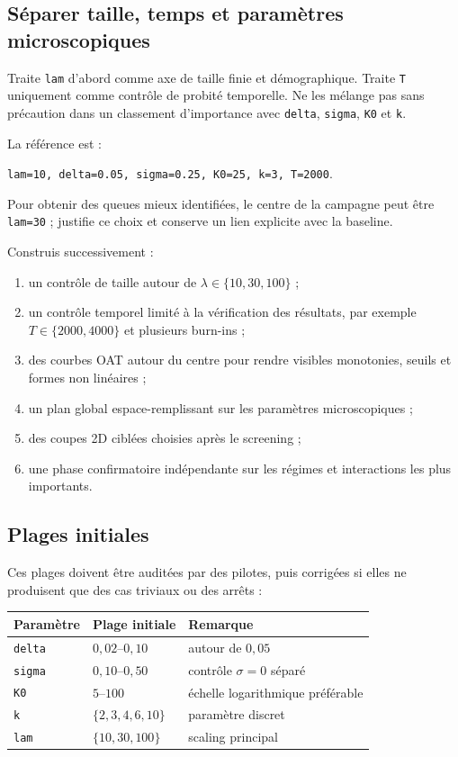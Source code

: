 \documentclass[11pt,a4paper]{article}
\newcommand{\code}[1]{\texttt{\color{navy}#1}}
\begin{document}
\subsection{Séparer taille, temps et paramètres microscopiques}

Traite \code{lam} d'abord comme axe de taille finie et démographique. Traite
\code{T} uniquement comme contrôle de probité temporelle. Ne les mélange pas
sans précaution dans un classement d'importance avec \code{delta},
\code{sigma}, \code{K0} et \code{k}.

La référence est :

\begin{center}
\code{lam=10, delta=0.05, sigma=0.25, K0=25, k=3, T=2000}.
\end{center}

Pour obtenir des queues mieux identifiées, le centre de la campagne peut être
\code{lam=30} ; justifie ce choix et conserve un lien explicite avec la
baseline.

Construis successivement :

\begin{enumerate}
  \item un contrôle de taille autour de $\lambda\in\{10,30,100\}$ ;
  \item un contrôle temporel limité à la vérification des résultats, par
    exemple $T\in\{2000,4000\}$ et plusieurs burn-ins ;
  \item des courbes OAT autour du centre pour rendre visibles monotonies,
    seuils et formes non linéaires ;
  \item un plan global espace-remplissant sur les paramètres microscopiques ;
  \item des coupes 2D ciblées choisies après le screening ;
  \item une phase confirmatoire indépendante sur les régimes et interactions
    les plus importants.
\end{enumerate}

\subsection{Plages initiales}

Ces plages doivent être auditées par des pilotes, puis corrigées si elles ne
produisent que des cas triviaux ou des arrêts :

\begin{center}
\begin{tabular}{@{}lll@{}}
\toprule
\textbf{Paramètre} & \textbf{Plage initiale} & \textbf{Remarque} \\
\midrule
\code{delta} & $0{,}02$--$0{,}10$ & autour de $0{,}05$ \\
\code{sigma} & $0{,}10$--$0{,}50$ & contrôle $\sigma=0$ séparé \\
\code{K0} & $5$--$100$ & échelle logarithmique préférable \\
\code{k} & $\{2,3,4,6,10\}$ & paramètre discret \\
\code{lam} & $\{10,30,100\}$ & scaling principal \\
\bottomrule
\end{tabular}
\end{center}
\end{document}
